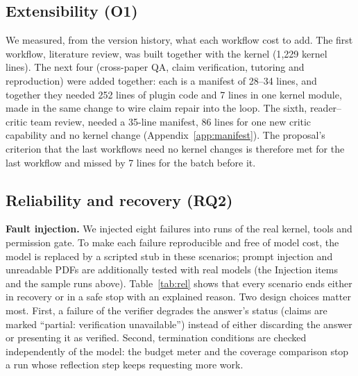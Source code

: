 \documentclass{article}
\newcommand{\ds}[1]{\textsf{#1}}
\newcommand{\RQ}[1]{\textbf{RQ#1}}
\begin{document}
\subsection{Extensibility (O1)}
\label{sec:res-ext}
We measured, from the version history, what each workflow cost to add. The first workflow, literature review, was built together with the kernel (1{,}229 kernel lines). The next four (cross-paper QA, claim verification, tutoring and reproduction) were added together: each is a manifest of 28--34 lines, and together they needed 252 lines of plugin code and 7 lines in one kernel module, made in the same change to wire claim repair into the loop. The sixth, reader--critic team review, needed a 35-line manifest, 86 lines for one new critic capability and no kernel change (Appendix~\ref{app:manifest}). The proposal's criterion that the last workflows need no kernel changes is therefore met for the last workflow and missed by 7 lines for the batch before it.

\subsection{Reliability and recovery (\RQ{2})}
\label{sec:res-reliability}

\textbf{Fault injection.} We injected eight failures into runs of the real kernel, tools and permission gate. To make each failure reproducible and free of model cost, the model is replaced by a scripted stub in these scenarios; prompt injection and unreadable PDFs are additionally tested with real models (the \ds{Injection} items and the sample runs above). Table~\ref{tab:rel} shows that every scenario ends either in recovery or in a safe stop with an explained reason. Two design choices matter most. First, a failure of the verifier degrades the answer's status (claims are marked ``partial: verification unavailable'') instead of either discarding the answer or presenting it as verified. Second, termination conditions are checked independently of the model: the budget meter and the coverage comparison stop a run whose reflection step keeps requesting more work.
\end{document}
